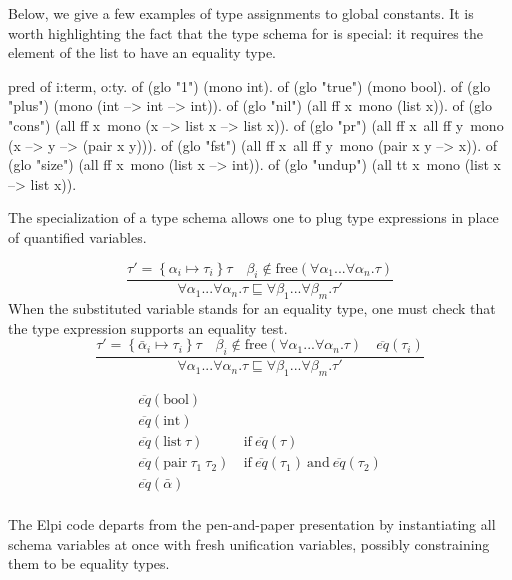 \documentclass[a4paper, 11pt]{book}
\begin{document}
Below, we give a few examples of type assignments to global constants. It is
worth highlighting the fact that the type schema for  is
special: it requires the element of the list to have an equality type.

\begin{elpicode}
pred of i:term, o:ty.
of (glo "1")      (mono int).
of (glo "true")   (mono bool).
of (glo "plus")   (mono (int --> int --> int)).
of (glo "nil")    (all ff x\ mono (list x)).
of (glo "cons")   (all ff x\ mono (x --> list x --> list x)).
of (glo "pr")     (all ff x\ all ff y\ mono (x --> y --> (pair x y))).
of (glo "fst")    (all ff x\ all ff y\ mono (pair x y --> x)).
of (glo "size")   (all ff x\ mono (list x --> int)).
of (glo "undup")  (all tt x\ mono (list x --> list x)).
\end{elpicode}
\noindent
The specialization of a type schema allows one to plug type expressions in
place of quantified variables.

$$
\displaystyle\frac{\tau' = \left\{\alpha_i \mapsto \tau_i\right\} \tau \quad \beta_i \not\in \textrm{free}(\forall \alpha_1...\forall\alpha_n . \tau)}{\forall \alpha_1...\forall\alpha_n . \tau \sqsubseteq \forall \beta_1...\forall\beta_m . \tau'}
$$
 When the substituted variable stands for an
equality type, one must check that the type expression supports an equality
test.
$$
\displaystyle\frac{\tau' = \left\{\bar\alpha_i \mapsto \tau_i\right\} \tau \quad \beta_i \not\in \textrm{free}(\forall \alpha_1...\forall\alpha_n . \tau) \quad \overline{eq}(\tau_i)}{\forall \alpha_1...\forall\alpha_n . \tau \sqsubseteq \forall \beta_1...\forall\beta_m . \tau'}
$$

$$
\begin{array}{ll}
  \overline{eq}(\mbox{bool}) & \\
  \overline{eq}(\mbox{int}) & \\
  \overline{eq}(\mbox{list}~\tau) & ~\mbox{if}~ \overline{eq}(\tau) \\
  \overline{eq}(\mbox{pair}~\tau_1~\tau_2) & ~\mbox{if}~ \overline{eq}(\tau_1) ~\mbox{and}~ \overline{eq}(\tau_2)\\
  \overline{eq}(\bar\alpha) & \\
\end{array}
$$

The Elpi code departs from the pen-and-paper presentation by instantiating all
schema variables at once with fresh unification variables, possibly
constraining them to be equality types.
\end{document}
